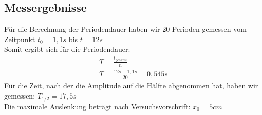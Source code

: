 \documentclass{article}
\begin{document}
      \subsection{Messergebnisse}
          Für die Berechnung der Periodendauer haben wir 20 Perioden gemessen vom Zeitpunkt $t_0= 1,1s$ bis $t=12s$\\
          Somit ergibt sich für die Periodendauer:\\
          \begin{equation}
              \begin{gathered}
                  T=\frac{t_{gesamt}}{n}\\
                  T=\frac{12s-1,1s}{20} = 0,545s
              \end{gathered}
          \end{equation}
          Für die Zeit, nach der die Amplitude auf die Hälfte abgenommen hat,  haben wir gemessen: $T_{1/2}=17,5s$\\
          Die maximale Auslenkung beträgt nach Versuchsvorschrift: $x_0=5cm$ \\
\end{document}
